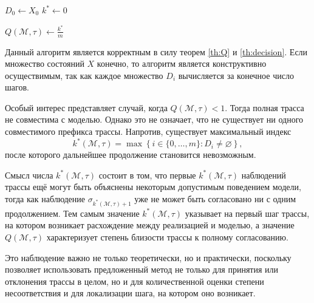 \begin{algorithm}[htp!]
    \SetAlgoLined

    $D_0 \gets X_0$\;
    $k^* \gets 0$\;


    $Q(\mathcal{M},\tau) \gets \frac{k^*}{m}$\;

    \;
    \caption{Нахождение максимального согласованного префикса трассы}
    \label{alg:trace-quality}
\end{algorithm}

Данный алгоритм является корректным в силу теорем \ref{th:Q} и
\ref{th:decision}. Если множество состояний $X$ конечно, то алгоритм является
конструктивно осуществимым, так как каждое множество $D_i$ вычисляется за
конечное число шагов.

Особый интерес представляет случай, когда $Q(\mathcal{M},\tau) < 1$. Тогда
полная трасса не совместима с моделью. Однако это не означает, что не
существует ни одного совместимого префикса трассы. Напротив, существует
максимальный индекс
\[
k^*(\mathcal{M},\tau)
=
\max
\left\{
i \in \{0,\dots,m\} : D_i \neq \varnothing
\right\},
\]
после которого дальнейшее продолжение становится невозможным.

Смысл числа $k^*(\mathcal{M},\tau)$ состоит в том, что первые
$k^*(\mathcal{M},\tau)$ наблюдений трассы ещё могут быть объяснены некоторым
допустимым поведением модели, тогда как наблюдение
$\sigma_{k^*(\mathcal{M},\tau)+1}$ уже не может быть согласовано ни с одним
продолжением. Тем самым значение $k^*(\mathcal{M},\tau)$ указывает на первый
шаг трассы, на котором возникает расхождение между реализацией и моделью, а
значение $Q(\mathcal{M},\tau)$ характеризует степень близости трассы к полному
согласованию.

Это наблюдение важно не только теоретически, но и практически, поскольку
позволяет использовать предложенный метод не только для принятия или
отклонения трассы в целом, но и для количественной оценки степени
несоответствия и для локализации шага, на котором оно возникает.
